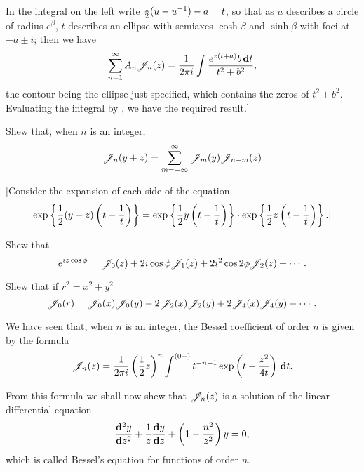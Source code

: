 %
%
In the integral on the left write $\frac{1}{2} (u - u^{-1}) - a = t$, so that as
$u$ describes a circle of radius $e^{\beta}$, $t$ describes an ellipse
with
semiaxes $\cosh\beta$ and $\sinh\beta$ with foci at
$-a \pm i$; then we have
$$
\sum_{n=1}^{\infty}
A_{n} \mathscr{J}_{n}(z)
=
\frac{1}{2\pi i}
\int
\frac{ e^{z(t+a)}b \, \mathbf{d} t  }{ t^{2} + b^{2}  },
$$
the contour being the ellipse just specified, which contains the zeros
of $t^{2} + b^{2}$. Evaluating the integral by
, we have the required result.]
\begin{wandwexample}
  Shew that, when $n$ is an integer,
  $$
  \mathscr{J}_{n}(y+z)
  =
  \sum_{m = -\infty}^{\infty} \mathscr{J}_{m}(y) \mathscr{J}_{n-m}(z)
  $$
\end{wandwexample}
[Consider the expansion of each side of the equation
$$
\exp \left\{  \frac{1}{2} (y+z) \left( t - \frac{1}{t} \right)   \right\}
=
\exp \left\{  \frac{1}{2} y \left( t - \frac{1}{t} \right)   \right\}
\cdot
\exp \left\{  \frac{1}{2} z \left( t - \frac{1}{t} \right)   \right\}.]
$$
\begin{wandwexample}
  Shew that
  $$
  e^{i z \cos \phi}
  =
  \mathscr{J}_{0}(z)
  + 2 i \cos\phi \mathscr{J}_{1}(z)
  + 2 i^{2} \cos 2\phi \mathscr{J}_{2}(z)
  + \cdots.
  $$
\end{wandwexample}
\begin{wandwexample}
  Shew that if $r^{2} = x^{2} + y^{2}$
  $$
  \mathscr{J}_{0}(r)
  =
  \mathscr{J}_{0}(x)\mathscr{J}_{0}(y)
  - 2 \mathscr{J}_{2}(x) \mathscr{J}_{2}(y)
  + 2 \mathscr{J}_{4}(x) \mathscr{J}_{4}(y)
  - \cdots .
  $$
\end{wandwexample}

We have seen that, when $n$ is an integer, the Bessel coefficient of
order $n$ is given by the formula
$$
\mathscr{J}_{n}(z)
=
\frac{1}{2\pi i}
\left( \frac{1}{2} z \right)^{n}
\int^{(0+)}
t^{-n-1}
\exp\left(  t - \frac{z^{2}}{4t}   \right)
\, \mathbf{d} t.
$$

From this formula we shall now shew that $\mathscr{J}_{n}(z)$ is a solution of the
linear differential equation
$$
\frac{\mathbf{d}^{2} y}{\mathbf{d} z^{2}}
+ \frac{1}{z} \frac{\mathbf{d} y}{\mathbf{d} z}
+ \left(  1 - \frac{n^{2}}{z^{2}}   \right) y
= 0,
$$
which is called Bessel's equation for functions of order $n$.

